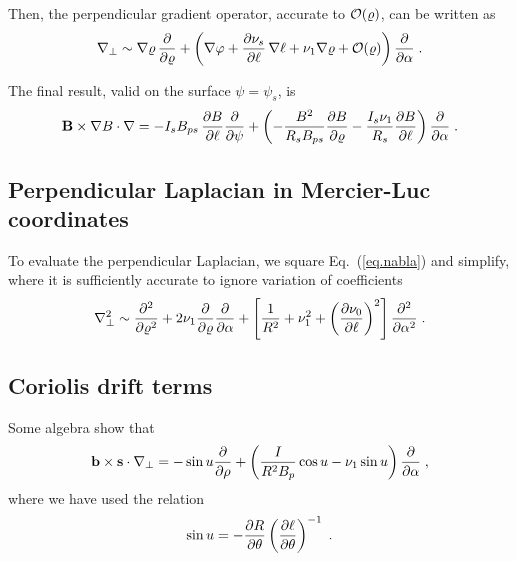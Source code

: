 \noindent
Then, the perpendicular gradient operator, accurate to ${\mathcal O}(\varrho)$, 
can be written as 
%
\begin{equation}
\nabla_\perp \sim \nabla\varrho \, \frac{\partial}{\partial\varrho}+
\left( \nabla\varphi + \frac{\partial \nu_s}{\partial\ell} \, \nabla\ell 
         + \nu_1 \nabla\varrho + {\mathcal O}(\varrho) \right) 
\frac{\partial}{\partial\alpha} \; .
\label{eq.nabla}
\end{equation}

\noindent
The final result, valid on the surface $\psi = \psi_s$, is 
%
\begin{equation}
\mathbf{B} \times \nabla B \cdot \nabla = 
-I_s B_{ps} \, \frac{\partial B}{\partial\ell} 
\frac{\partial}{\partial\psi} + \left( 
-\frac{B^2}{R_s B_{ps}}\frac{\partial B}{\partial\varrho}
-\frac{I_s \nu_1}{R_s}\frac{\partial B}{\partial\ell} \right) 
\frac{\partial}{\partial\alpha} \; .
\end{equation}

\subsection{Perpendicular Laplacian in Mercier-Luc coordinates}

To evaluate the perpendicular Laplacian, we square Eq.~(\ref{eq.nabla}) 
and simplify, where it is sufficiently accurate to ignore variation of 
coefficients
%
\begin{equation}
\nabla_\perp^2 \sim \frac{\partial^2}{\partial \varrho^2}
+ 2 \nu_1  \frac{\partial}{\partial \varrho} \frac{\partial}{\partial \alpha}
+ \left[ \frac{1}{R^2} + \nu_1^2 + \left( \frac{\partial \nu_0}{\partial\ell} 
\right)^2 \right] \frac{\partial^2}{\partial \alpha^2} \; .
\end{equation}

\subsection{Coriolis drift terms}

Some algebra show that 
%
\begin{equation}
\mathbf{b} \times \mathbf{s} \cdot \nabla_\perp = 
-\sin u\frac{\partial}{\partial\rho}
+ \left(\frac{I}{R^2B_p} \cos u - \nu_1 \sin u \right)
\frac{\partial}{\partial\alpha} \; ,
\end{equation}
%
where we have used the relation
%
\begin{equation}
\sin u = - \frac{\partial R}{\partial\theta} \left( 
\frac{\partial\ell}{\partial\theta} \right)^{-1} \; .
\end{equation}

